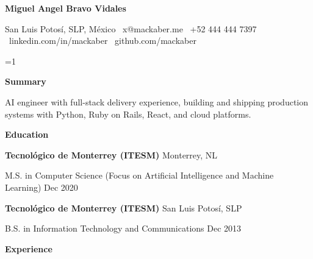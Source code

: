 \documentclass[11pt]{article}
\providecommand{\CVProfile}{ai-engineer}
\providecommand{\IncludeSummary}{1}
\newcommand{\ProfileSwitch}[3]{%
    \ifstrequal{\CVProfile}{academic}{#1}{%
        \ifstrequal{\CVProfile}{fullstack-engineer}{#2}{#3}%
    }%
}
\newcommand{\ProfileSummary}{\ProfileSwitch{
Computer science M.S. with teaching and mentoring experience, focused on AI/ML education and applied research-to-practice software projects.
}{
Full-stack software engineer with production delivery experience building scalable platforms and product features across backend, frontend, and cloud infrastructure.
}{
AI engineer with full-stack delivery experience, building and shipping production systems with Python, Ruby on Rails, React, and cloud platforms.
}}
\begin{document}
\begin{center}
    \textbf{\LARGE Miguel Angel Bravo Vidales}\\ 
    \vspace{4pt}
    \hrulefill
\end{center}

\begin{center}
    San Luis Potosí, SLP, México \textbullet \ x@mackaber.me \textbullet \ +52 444 444 7397 \textbullet \ linkedin.com/in/mackaber \textbullet \ github.com/mackaber
\end{center}

\ifnum\IncludeSummary=1
\vspace{6pt}
\begin{center}
    \textbf{Summary}
\end{center}
\ProfileSummary
\fi

\vspace{0.5pt}

\begin{center}
    \textbf{Education}
\end{center}
\textbf{Tecnológico de Monterrey (ITESM)} \hfill Monterrey, NL

\ProfileSwitch{
M.S. in Computer Science \hfill 2018 -- 2019
}{
M.S. in Computer Science \hfill Dec 2020
}{
M.S. in Computer Science (Focus on Artificial Intelligence and Machine Learning) \hfill Dec 2020
}

\vspace{10pt}

\textbf{Tecnológico de Monterrey (ITESM)} \hfill	San Luis Potosí, SLP

\ProfileSwitch{
B.S. in Information Technology and Communications (ITIC) \hfill 2009 -- 2013
\begin{itemize}[noitemsep, topsep=2pt, partopsep=0pt, parsep=0pt]
    \item DAE Award ``For Student Development''
    \item CENEVAL Award for Outstanding EGEL Performance (2014)
\end{itemize}
}{
B.S. in Information Technology and Communications \hfill Dec 2013
}{
B.S. in Information Technology and Communications \hfill Dec 2013
}

\vspace{12pt}

\begin{center}
    \textbf{Experience}
\end{center}
\end{document}
